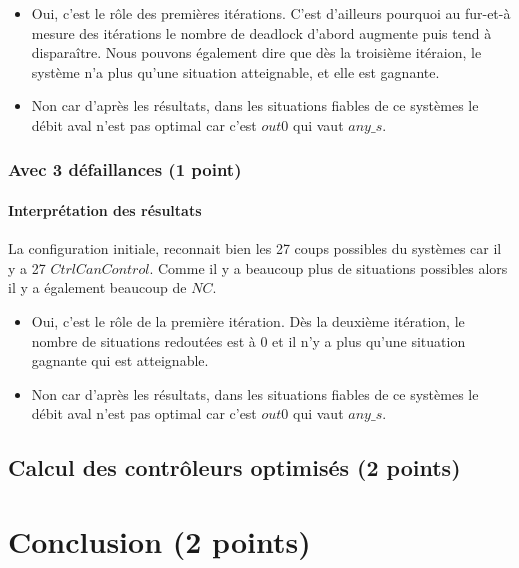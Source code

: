 \documentclass[a4paper]{book}
\begin{document}
\begin{itemize}
	\item Oui, c'est le rôle des premières itérations. C'est d'ailleurs pourquoi au fur-et-à mesure des itérations le nombre de deadlock d'abord augmente puis tend à disparaître. Nous pouvons également dire que dès la troisième itéraion, le système n'a plus qu'une situation atteignable, et elle est gagnante.
	\item Non car d'après les résultats, dans les situations fiables de ce systèmes le débit aval n'est pas optimal car c'est $out0$ qui vaut $any\_s$.
\end{itemize}

\subsubsection{Avec 3 défaillances (1 point)}





\paragraph{Interprétation des résultats}

La configuration initiale, reconnait bien les 27 coups possibles du systèmes car il y a 27 $CtrlCanControl$. Comme il y a beaucoup plus de situations possibles alors il y a également beaucoup de $NC$.

\begin{itemize}
	\item Oui, c'est le rôle de la première itération. Dès la deuxième itération, le nombre de situations redoutées est à 0 et il n'y a plus qu'une situation gagnante qui est atteignable.
	\item Non car d'après les résultats, dans les situations fiables de ce systèmes le débit aval n'est pas optimal car c'est $out0$ qui vaut $any\_s$.
\end{itemize}

\subsection{Calcul des contrôleurs optimisés (2 points)}

\section{Conclusion (2 points)}
\end{document}
